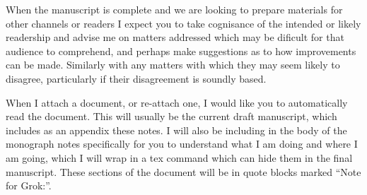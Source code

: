 When the manuscript is complete and we are looking to prepare materials for other channels or readers I expect you to take cognisance of the intended or likely readership and advise me on matters addressed which may be dificult for that audience to comprehend, and perhaps make suggestions as to how improvements can be made.
Similarly with any matters with which they may seem likely to disagree, particularly if their disagreement is soundly based.

When I attach a document, or re-attach one, I would like you to automatically read the document.
This will usually be the current draft manuscript, which includes as an appendix these notes.
I will also be including in the body of the monograph notes specifically for you to understand what I am doing and where I am going, which I will wrap in a tex command which can hide them in the final manuscript.
These sections of the document will be in quote blocks marked ``Note for Grok:''.


